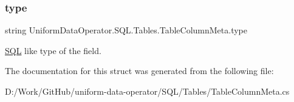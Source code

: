 \subsubsection{\texorpdfstring{type}{type}}
{\footnotesize\ttfamily string Uniform\+Data\+Operator.\+S\+Q\+L.\+Tables.\+Table\+Column\+Meta.\+type}



\mbox{\hyperlink{namespace_uniform_data_operator_1_1_s_q_l}{S\+QL}} like type of the field. 



The documentation for this struct was generated from the following file\+:\begin{DoxyCompactItemize}
\item 
D\+:/\+Work/\+Git\+Hub/uniform-\/data-\/operator/\+S\+Q\+L/\+Tables/Table\+Column\+Meta.\+cs\end{DoxyCompactItemize}
